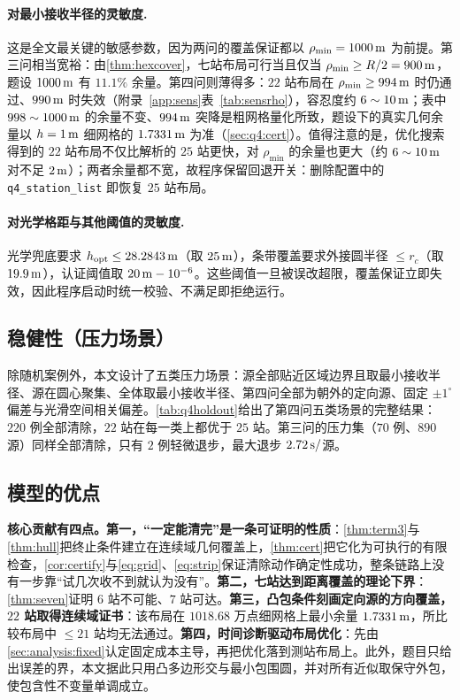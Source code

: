 \paragraph{对最小接收半径的灵敏度.} 这是全文最关键的敏感参数，因为两问的覆盖保证都以 $\rho_{\min}=1000\,\mathrm{m}$ 为前提。第三问相当宽裕：由\cref{thm:hexcover}，七站布局可行当且仅当 $\rho_{\min}\ge R/2=900\,\mathrm{m}$，题设 $1000\,\mathrm{m}$ 有 $11.1\%$ 余量。第四问则薄得多：$22$ 站布局在 $\rho_{\min}\ge994\,\mathrm{m}$ 时仍通过、$990\,\mathrm{m}$ 时失效（附录~\ref{app:sens}表~\ref{tab:sensrho}），容忍度约 $6\sim10\,\mathrm{m}$；表中 $998\sim1000\,\mathrm{m}$ 的余量不变、$994\,\mathrm{m}$ 突降是粗网格量化所致，题设下的真实几何余量以 $h=1\,\mathrm{m}$ 细网格的 $1.7331\,\mathrm{m}$ 为准（\cref{sec:q4:cert}）。值得注意的是，优化搜索得到的 $22$ 站布局不仅比解析的 $25$ 站更快，对 $\rho_{\min}$ 的余量也更大（约 $6\sim10\,\mathrm{m}$ 对不足 $2\,\mathrm{m}$）；两者余量都不宽，故程序保留回退开关：删除配置中的 \texttt{q4\_station\_list} 即恢复 $25$ 站布局。

\paragraph{对光学格距与其他阈值的灵敏度.} 光学兜底要求 $h_{\rm opt}\le28.2843\,\mathrm{m}$（取 $25\,\mathrm{m}$），条带覆盖要求外接圆半径 $\le r_c$（取 $19.9\,\mathrm{m}$），认证阈值取 $20\,\mathrm{m}-10^{-6}$。这些阈值一旦被误改超限，覆盖保证立即失效，因此程序启动时统一校验、不满足即拒绝运行。

\subsection{稳健性（压力场景）}

除随机案例外，本文设计了五类压力场景：源全部贴近区域边界且取最小接收半径、源在圆心聚集、全体取最小接收半径、第四问全部为朝外的定向源、固定 $\pm1^\circ$ 偏差与光滑空间相关偏差。\cref{tab:q4holdout}给出了第四问五类场景的完整结果：$220$ 例全部清除，$22$ 站在每一类上都优于 $25$ 站。第三问的压力集（$70$ 例、$890$ 源）同样全部清除，只有 $2$ 例轻微退步，最大退步 $2.72\,\mathrm{s}/$源。

\subsection{模型的优点}

\textbf{核心贡献有四点。第一，“一定能清完”是一条可证明的性质}：\cref{thm:term3}与\cref{thm:hull}把终止条件建立在连续域几何覆盖上，\cref{thm:cert}把它化为可执行的有限检查，\cref{cor:certify}与\cref{eq:grid}、\cref{eq:strip}保证清除动作确定性成功，整条链路上没有一步靠“试几次收不到就认为没有”。\textbf{第二，七站达到距离覆盖的理论下界}：\cref{thm:seven}证明 $6$ 站不可能、$7$ 站可达。\textbf{第三，凸包条件刻画定向源的方向覆盖，$22$ 站取得连续域证书}：该布局在 $1018.68$ 万点细网格上最小余量 $1.7331\,\mathrm{m}$，所比较布局中 $\le21$ 站均无法通过。\textbf{第四，时间诊断驱动布局优化}：先由\cref{sec:analysis:fixed}认定固定成本主导，再把优化落到测站布局上。此外，题目只给出误差的界，本文据此只用凸多边形交与最小包围圆，并对所有近似取保守外包，使包含性不变量单调成立。

